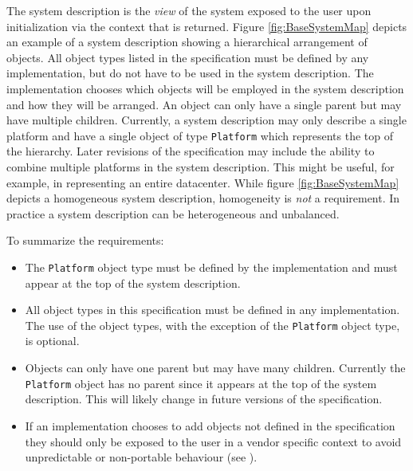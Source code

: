 The system description is the \textit{view} of the system exposed to the user upon initialization via the context that is returned.
Figure \ref{fig:BaseSystemMap} depicts an example of a system description showing a hierarchical arrangement of objects.
All object types listed in the specification must be defined by any implementation, but do not have to be used in the system description.
The implementation chooses which objects will be employed in the system description and how they will be arranged.
An object can only have a single parent but may have multiple children.
Currently, a system description may only describe a single platform and have a single object of type \texttt{Platform} which represents the top of the hierarchy. 
Later revisions of the specification may include the ability to combine multiple platforms in the system description. 
This might be useful, for example, in representing an entire datacenter. 
While figure \ref{fig:BaseSystemMap} depicts a homogeneous system description, homogeneity is \textit{not} a requirement. 
In practice a system description can be heterogeneous and unbalanced.

To summarize the requirements:
\begin{itemize}[noitemsep,nolistsep] %
	\item{
	The \texttt{Platform} object type must be defined by the implementation and must appear at the top of the system description.
	}
	\item{
	All object types in this specification must be defined in any implementation. The use of the object types, with the exception of the \texttt{Platform} object type, is optional.
	}
	\item{
	Objects can only have one parent but may have many children. Currently the \texttt{Platform} object has no parent since it appears at the top of the system description. This will likely change in future versions of the specification.
	}
        \item{
        If an implementation chooses to add objects not defined in the specification they should only be exposed to the user in a vendor specific context to avoid unpredictable or non-portable behaviour (see ).
        }
\end{itemize}


